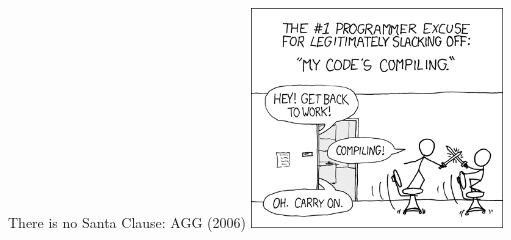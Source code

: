 \documentclass[
  ignorenonframetext,
]{beamer}
\begin{document}
\begin{frame}{There is no Santa Clause: AGG (2006)}
\protect\hypertarget{there-is-no-santa-clause-agg-2006}{}
\center \includegraphics[width=0.5\textwidth,height=\textheight]{"images/codecomic2.png"}
\end{frame}
\end{document}
